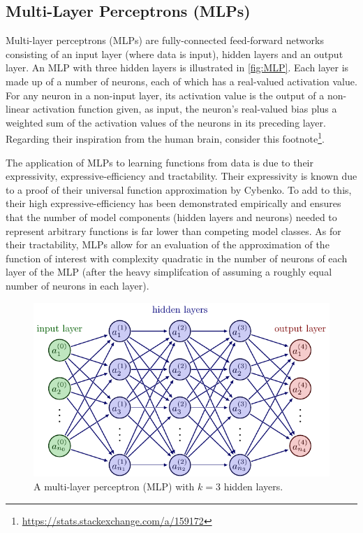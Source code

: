 \documentclass[11pt]{article}
\begin{document}
\subsection{Multi-Layer Perceptrons (MLPs)}
\label{sec:multi_layer_perceptrons}

Multi-layer perceptrons (MLPs) are fully-connected feed-forward networks consisting of an input layer (where data is input), hidden layers and an output layer. An MLP with three hidden layers is illustrated in \autoref{fig:MLP}. Each layer is made up of a number of neurons, each of which has a real-valued activation value.  For any neuron in a non-input layer, its activation value is the output of a non-linear activation function given, as input, the neuron's real-valued bias plus a weighted sum of the activation values of the neurons in its preceding layer. Regarding their inspiration from the human brain, consider this footnote\footnote{\url{https://stats.stackexchange.com/a/159172}}.

The application of MLPs to learning functions from data is due to their expressivity, expressive-efficiency and tractability. Their expressivity is known due to a proof of their universal function approximation by Cybenko. To add to this, their high expressive-efficiency has been demonstrated empirically and ensures that the number of model components (hidden layers and neurons) needed to represent arbitrary functions is far lower than competing model classes. As for their tractability, MLPs allow for an evaluation of the approximation of the function of interest with complexity quadratic in the number of neurons of each layer of the MLP (after the heavy simplifcation of assuming a roughly equal number of neurons in each layer).

\begin{figure}[t]
    \centering
    \includegraphics[width=1\linewidth]{./figures/neural_nets/MLP_1.pdf}
    \caption{A multi-layer perceptron (MLP) with $k=3$ hidden layers.}
    \label{fig:MLP}
\end{figure}
\end{document}
